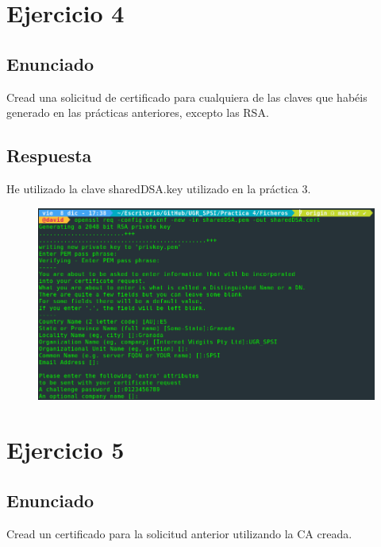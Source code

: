 \documentclass[10pt,a4paper,spanish]{report}
\begin{document}
\chapter{Ejercicio 4}

\section{Enunciado}
\noindent
Cread una solicitud de certificado para cualquiera de las claves que habéis generado en las prácticas anteriores, excepto las RSA.

\section{Respuesta}
\noindent
He utilizado la clave sharedDSA.key utilizado en la práctica 3.

\begin{figure}[!hbp]
 \centering  \includegraphics[width=1\textwidth]{./Imagenes/4.png}
\end{figure}

\chapter{Ejercicio 5}

\section{Enunciado}
\noindent
Cread un certificado para la solicitud anterior utilizando la CA creada.
\end{document}
